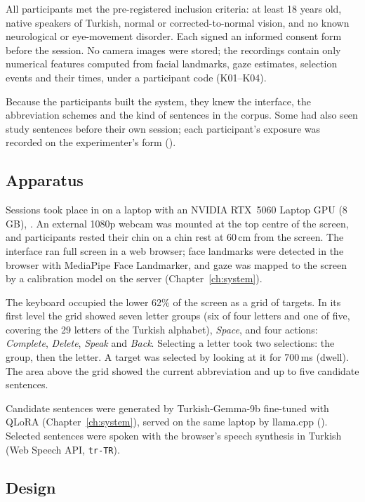 All participants met the pre-registered inclusion criteria: at least 18 years old, native speakers
of Turkish, normal or corrected-to-normal vision, and no known neurological or eye-movement disorder.
Each signed an informed consent form before the session. No camera images were stored; the
recordings contain only numerical features computed from facial landmarks, gaze estimates,
selection events and their times, under a participant code (K01--K04).

Because the participants built the system, they knew the interface, the abbreviation schemes and the
kind of sentences in the corpus. Some had also seen study sentences before their own session; each
participant's exposure was recorded on the experimenter's form ().

\subsection{Apparatus}
\label{sec:b-apparatus}

Sessions took place in  on a laptop with an NVIDIA RTX~5060 Laptop GPU (8\,GB),
. An external 1080p webcam was mounted at the top
centre of the screen, and participants rested their chin on a chin rest at 60\,cm from the screen.
The interface ran full screen in a web browser; face landmarks were detected in the browser with
MediaPipe Face Landmarker, and gaze was mapped to the screen by a calibration model on the server
(Chapter~\ref{ch:system}).

The keyboard occupied the lower 62\% of the screen as a grid of 
targets. In its first level the grid showed seven letter groups (six of four letters and one of five,
covering the 29 letters of the Turkish alphabet), \emph{Space}, and four actions: \emph{Complete},
\emph{Delete}, \emph{Speak} and \emph{Back}. Selecting a letter took two selections: the group, then
the letter. A target was selected by looking at it for 700\,ms (dwell). The area above the grid showed
the current abbreviation and up to five candidate sentences.

Candidate sentences were generated by Turkish-Gemma-9b fine-tuned with QLoRA (Chapter~\ref{ch:system}),
served on the same laptop by llama.cpp (). Selected sentences were spoken
with the browser's speech synthesis in Turkish (Web Speech API, \texttt{tr-TR}).

\subsection{Design}
\label{sec:b-design}

